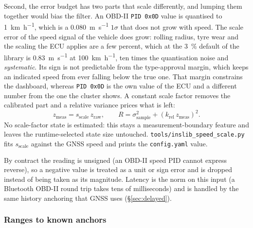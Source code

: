 \documentclass[11pt,a4paper]{article}
\newcommand{\code}[1]{\texttt{#1}}
\begin{document}
Second, the error budget has two parts that scale differently, and
lumping them together would bias the filter. An OBD-II \code{PID 0x0D}
value is quantised to \SI{1}{\kilo\metre\per\hour}, which is a
\SI{0.080}{\metre\per\second} $1\sigma$ that does not grow with speed.
The scale error of the speed signal of the vehicle does grow: rolling radius,
tyre wear and the scaling the ECU applies are a few percent, which at the
\SI{3}{\percent} default of the library is \SI{0.83}{\metre\per\second} at
\SI{100}{\kilo\metre\per\hour}, ten times the quantisation noise and
\emph{systematic}. Its sign is not predictable from the type-approval
margin, which keeps an indicated speed from ever falling below the true
one. That margin constrains the dashboard, whereas \code{PID 0x0D} is the
own value of the ECU and a different number from the one the cluster shows. A
constant scale factor removes the calibrated part and a relative variance
prices what is left:
\begin{equation}
  z_{\text{meas}} = s_{\text{scale}}\, z_{\text{raw}} , \qquad
  R = \sigma_{\text{sample}}^2 + \left(k_{\text{rel}}\,
      z_{\text{meas}}\right)^2 .
\end{equation}
No scale-factor state is estimated: this stays a measurement-boundary
feature and leaves the runtime-selected state size untouched.
\code{tools/inslib\_\allowbreak{}speed\_\allowbreak{}scale.py} fits
$s_{\text{scale}}$ against the GNSS speed and prints the \code{config.yaml}
value.

By contract the reading is unsigned (an OBD-II speed PID cannot express
reverse), so a negative value is treated as a unit or sign error and is dropped
instead of being taken as its magnitude. Latency is the norm on this input (a
Bluetooth OBD-II round trip takes tens of milliseconds) and is handled by the
same history anchoring that GNSS uses (\S\ref{sec:delayed}).

\subsubsection{Ranges to known anchors}
\label{sec:range}
\end{document}
